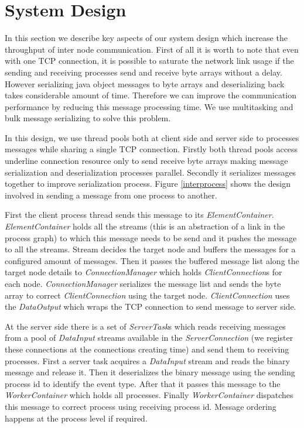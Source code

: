 \section{System Design}
In this section we describe key aspects of our system design which increase the throughput of inter node communication. First of all it is worth to note that even with one TCP connection, it is possible to saturate the network link usage if the sending and receiving processes send and receive byte arrays without a delay. However serializing java object messages to byte arrays and deserializing back takes considerable amount of time. Therefore we can improve the communication performance by reducing this message processing time. We use multitasking and bulk message serializing to solve this problem.  

In this design, we use thread pools both at client side and server side to processes messages while sharing a single TCP connection. Firstly both thread pools access underline connection resource only to send receive byte arrays making message serialization and deserialization processes parallel. Secondly it serializes messages together to improve serialization process.  Figure \ref{interprocess} shows the design involved in sending a message from one process to another. 

First the client process thread sends this message to its \textit{ElementContainer}. \textit{ElementContainer} holds all the streams (this is an abstraction of a link in the process graph) to which this message needs to be send and it pushes the message to all the streams. Stream decides the target node and buffers the messages for a configured amount of messages. Then it passes the buffered  message list along the target node details to \textit{ConnectionManager} which holds \textit{ClientConnection}s for each node. \textit{ConnectionManager} serializes the message list and sends the byte array to correct \textit{ClientConnection} using the target node. \textit{ClientConnection} uses the \textit{DataOutput} which wraps the TCP connection to send message to server side.

At the server side there is a set of \textit{ServerTask}s which reads receiving messages from a pool of \textit{DataInput} streams available in the \textit{ServerConnection} (we register these connections at the connections creating time) and send them to receiving processes. First a server task acquires a \textit{DataInput} stream and reads the binary message and release it. Then it deserializes the binary message using the sending process id to identify the event type.  After that it passes this message to the \textit{WorkerContainer} which holds all processes. Finally \textit{WorkerContainer} dispatches this message to correct process using receiving process id. Message ordering happens at the process level if required. 

